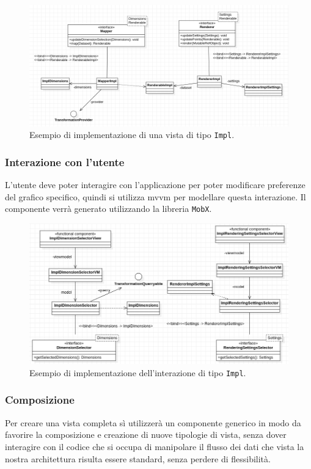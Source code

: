 \begin{figure}[h!]
  \centering
  \includegraphics[scale=0.60]{../../assets/classi_uml/modelvista.png}
  \caption{Esempio di implementazione di una vista di tipo \texttt{Impl}.}
\end{figure}
\newpage
\subsubsection{Interazione con l'utente}
L'utente deve poter interagire con l'applicazione per poter modificare
preferenze del grafico specifico, quindi si utilizza mvvm per modellare questa
interazione. Il componente verrà generato utilizzando la libreria \texttt{MobX}.

\begin{figure}[h!]
  \centering
  \includegraphics[scale=0.55]{../../assets/classi_uml/modelinterazione.png}
  \caption{Esempio di implementazione dell'interazione di tipo \texttt{Impl}.}
\end{figure}

\subsubsection{Composizione}
Per creare una vista completa sì utilizzerà un componente generico in modo da
favorire la composizione e creazione di nuove tipologie di vista, senza dover
interagire con il codice che si occupa di manipolare il flusso dei dati che vista
la nostra architettura risulta essere standard, senza perdere di flessibilità.


